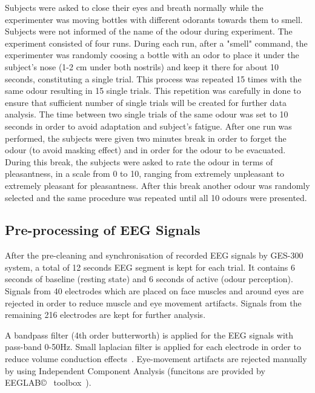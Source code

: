 \documentclass[conference]{IEEEtran}
\begin{document}
Subjects were asked to close their eyes and breath normally while the experimenter was moving bottles with different odorants towards them to smell. Subjects were not informed of the name of the odour during experiment. The experiment consisted of four runs. During each run, after a "smell" command, the experimenter was randomly coosing a bottle with an odor to place it under the subject's nose (1-2 cm under both nostrils) and keep it there for about 10 seconds, constituting a single trial. This process was repeated 15 times with the same odour resulting in 15 single trials. This repetition was carefully in done to ensure that sufficient number of single trials will be created for further data analysis. The time between two single trials of the same odour was set to 10 seconds in order to avoid adaptation and subject's fatigue. After one run was performed, the subjects were given two minutes break in order to forget the odour (to avoid masking effect) and in order for the odour to be evacuated. During this break, the subjects were asked to rate the odour in terms of pleasantness, in a scale from 0 to 10, ranging from extremely unpleasant to extremely pleasant for pleasantness. After this break another odour was randomly selected and the same procedure was repeated until all 10 odours were presented.    

\subsection{Pre-processing of EEG Signals}
After the pre-cleaning and synchronisation of recorded EEG signals by GES-300 system, a total of 12 seconds EEG segment is kept for each trial. It contains 6 seconds of baseline (resting state) and 6 seconds of active (odour perception). Signals from 40 electrodes which are placed on face muscles and around eyes are rejected in order to reduce muscle and eye movement artifacts. Signals from the remaining 216 electrodes are kept for further analysis. 

A bandpass filter (4th order butterworth) is applied for the EEG signals with pass-band 0-50Hz. Small laplacian filter is applied for each electrode in order to reduce volume conduction effects~\cite{wolters2007volume}. Eye-movement artifacts are rejected manually by using Independent Component Analysis (funcitons are provided by EEGLAB\copyright~ toolbox~\cite{luck2014introduction}). 
\end{document}
